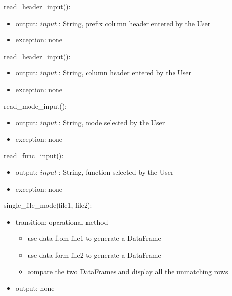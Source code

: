 \documentclass[12pt]{article}
\begin{document}
\noindent read\_header\_input():
\begin{itemize}
  \item output: $input$ : String, prefix column header entered by the User
  \item exception: none
\end{itemize}

\noindent read\_header\_input():
\begin{itemize}
  \item output: $input$ : String, column header entered by the User
  \item exception: none
\end{itemize}

\noindent read\_mode\_input():
\begin{itemize}
  \item output: $input$ : String, mode selected by the User
  \item exception: none
\end{itemize}

\noindent read\_func\_input():
\begin{itemize}
  \item output: $input$ : String, function selected by the User
  \item exception: none
\end{itemize}

\noindent single\_file\_mode(file1, file2):
\begin{itemize}
  \item transition: operational method 
  \begin{itemize}[\null]
    \item use data from file1 to generate a DataFrame
    \item use data form file2 to generate a DataFrame
    \item compare the two DataFrames and display all the unmatching rows
  \end{itemize}
  \item output: none
\end{itemize}
\end{document}
